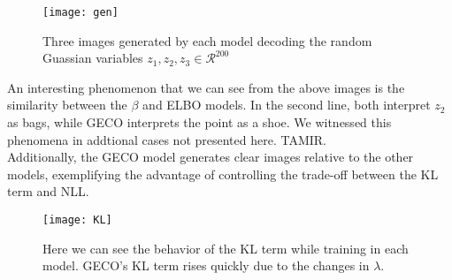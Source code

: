 \begin{figure}[H]
\texttt{[image: gen]}
\caption{Three images generated by each model decoding the random Guassian variables $z_1,z_2,z_3\in \mathcal{R}^{200}$}
\centering
\end{figure}
An interesting phenomenon that we can see from the above images is the similarity between the $\beta$ and ELBO models. In the second line, both interpret $z_2$ as bags, while GECO interprets the point as a shoe. We witnessed this phenomena in addtional cases not presented here. TAMIR.\\
Additionally, the GECO model generates clear images relative to the other models, exemplifying the advantage of controlling the trade-off between the KL term and NLL. 

\begin{figure}[H]
\texttt{[image: KL]}
\caption{Here we can see the behavior of the KL term while training in each model. GECO's KL term rises quickly due to the changes in $\lambda$. }
\centering
\end{figure}

